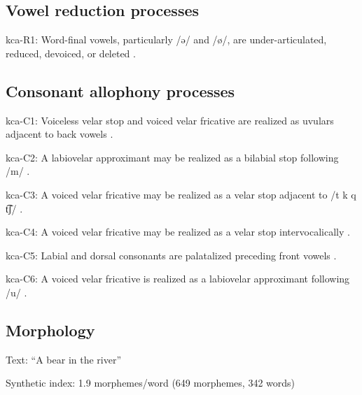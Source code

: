 {\subsection*{Vowel reduction processes}
\begin{appendixdesc}

\item[kca-R1:] Word-final vowels, particularly /ə/ and /ø/, are under-articulated, reduced, devoiced, or deleted \citep[56]{Filchenko2007}.
\end{appendixdesc}
\subsection*{Consonant allophony processes}
\begin{appendixdesc}

\item[kca-C1:] Voiceless velar stop and voiced velar fricative are realized as uvulars adjacent to back vowels \citep[41]{Filchenko2007}.

\item[kca-C2:] A labiovelar approximant may be realized as a bilabial stop following /m/ \citep[44--45]{Filchenko2007}.

\item[kca-C3:] A voiced velar fricative may be realized as a velar stop adjacent to /t k q t͡ʃ/ \citep[45]{Filchenko2007}.

\item[kca-C4:] A voiced velar fricative may be realized as a velar stop intervocalically \citep[45]{Filchenko2007}.

\item[kca-C5:] Labial and dorsal consonants are palatalized preceding front vowels \citep[37]{Filchenko2007}.

\item[kca-C6:] A voiced velar fricative is realized as a labiovelar approximant following /u/ \citep[45--46]{Filchenko2007}.
\end{appendixdesc}
\subsection*{Morphology}

\begin{appendixdesc}

\item[Text:] “A bear in the river” \citep[582--588]{Filchenko2007}

\item[Synthetic index:] 1.9 morphemes/word (649 morphemes, 342 words)
\end{appendixdesc}
}
